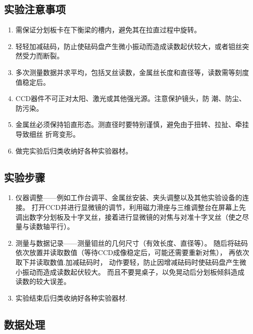 \documentclass[UTF8]{article}
\theoremstyle{MyLineTheoremStyle} %
\theoremstyle{MyBlockTheoremStyle} %
\theoremstyle{MySubsubsectionStyle} %
\begin{document}
\subsection{实验注意事项}
\begin{enumerate}
\item 需保证分划板卡在下衡梁的槽内，避免其在拉直过程中旋转。

\item 轻轻加减砝码，防止使砝码盘产生微小振动而造成读数起伏较大，或者钼丝突然受力而断裂。

\item 多次测量数据并求平均，包括叉丝读数，金属丝长度和直径等，读数需等刻度值稳定后。

\item CCD器件不可正对太阳、激光或其他强光源。注意保护镜头，防
潮、防尘、防污染。

\item 金属丝必须保持铅直形态。测直径时要特别谨慎，避免由于扭转、拉扯、牵挂导致细丝
折弯变形。

\item 做完实验后归类收纳好各种实验器材。
\end{enumerate}

\subsection{实验步骤}
\begin{enumerate}
\item 仪器调整——例如工作台调平、金属丝安装、夹头调整以及其他实验设备的连接。
打开CCD并进行显微镜的调节，利用磁力滑座与三维调整台在屏幕上先调出数字分划板及十字叉丝，接着进行显微镜的对焦与对准十字叉丝（使之尽量与读数轴平行）。

\item 测量与数据记录——测量钼丝的几何尺寸（有效长度、直径等）。
随后将砝码依次放置并读取数值（等待CCD成像稳定后，可能还需要重新对焦），
再依次取下并读取数值.加减砝码时，
动作要轻，防止因增减砝码时使砝码盘产生微小振动而造成读数起伏较大。
而且不要晃桌子，以免晃动后分划板倾斜造成读数的较大误差。

\item 实验结束后归类收纳好各种实验器材.
\end{enumerate}

\subsection{数据处理}
\end{document}
